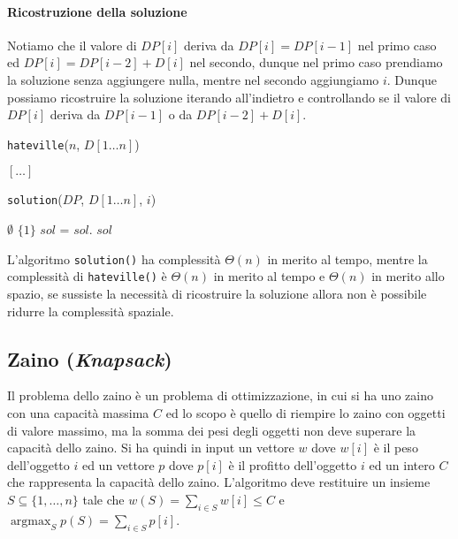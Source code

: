                 \paragraph{Ricostruzione della soluzione} Notiamo che il valore di $DP[i]$ deriva da $DP[i]=DP[i-1]$ nel primo caso ed $DP[i]=DP[i-2]+D[i]$ nel secondo, dunque nel primo caso prendiamo la soluzione senza aggiungere nulla, mentre nel secondo aggiungiamo $i$. Dunque possiamo ricostruire la soluzione iterando all'indietro e controllando se il valore di $DP[i]$ deriva da $DP[i-1]$ o da $DP[i-2]+D[i]$.
                \begin{algorithm}[H]
                    \caption{\Set \texttt{hateville}(\Int $n$, \Int $D[1 \ldots n]$)}
                    \begin{algorithmic}
                        \State $[\dots]$
                        \State \Return {}
                    \end{algorithmic}
                \end{algorithm}
                \begin{algorithm}[H]
                    \caption{\Set \texttt{solution}(\Int[] $DP$, \Int $D[1 \ldots n]$, \Int $i$)}
                    \begin{algorithmic}
                            \State \Return $\emptyset$
                            \State \Return $\{1\}$
                            \State \Return {}
                        \Else
                            \State \Set $sol$ = 
                            \State $sol$.
                            \State \Return $sol$
                        \EndIf
                    \end{algorithmic}
                \end{algorithm}
                L'algoritmo \texttt{solution()} ha complessità $\Theta(n)$ in merito al tempo, mentre la complessità di \texttt{hateville()} è $\Theta(n)$ in merito al tempo e $\Theta(n)$ in merito allo spazio, se sussiste la necessità di ricostruire la soluzione allora non è possibile ridurre la complessità spaziale.
        \subsection{Zaino (\textit{Knapsack})}
            \label{subsec:knapsack}
            Il problema dello zaino è un problema di ottimizzazione, in cui si ha uno zaino con una capacità massima $C$ ed lo scopo è quello di riempire lo zaino con oggetti di valore massimo, ma la somma dei pesi degli oggetti non deve superare la capacità dello zaino.\newline
            Si ha quindi in input un vettore $w$ dove $w[i]$ è il peso dell'oggetto $i$ ed un vettore $p$ dove $p[i]$ è il profitto dell'oggetto $i$ ed un intero $C$ che rappresenta la capacità dello zaino. L'algoritmo deve restituire un insieme $S\subseteq \{1,\ldots,n\}$ tale che $w(S)=\sum_{i\in S}w[i]\leq C$ e $\operatorname{argmax}_Sp(S)=\sum_{i\in S}p[i]$.

